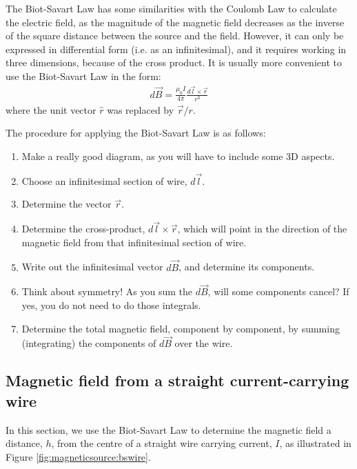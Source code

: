 The Biot-Savart Law has some similarities with the Coulomb Law to calculate the electric field, as the magnitude of the magnetic field decreases as the inverse of the square distance between the source and the field. However, it can only be expressed in differential form (i.e. as an infinitesimal), and it requires working in three dimensions, because of the cross product. It is usually more convenient to use the Biot-Savart Law in the form:
\begin{align*}
d\vec B = \frac{\mu_0 I}{4\pi}\frac{d\vec l\times \vec r}{r^3}
\end{align*}
where the unit vector $\hat r$ was replaced by $\vec r/r$.

The procedure for applying the Biot-Savart Law is as follows:
\begin{enumerate}
\item Make a really good diagram, as you will have to include some 3D aspects.
\item Choose an infinitesimal section of wire, $d\vec l$.
\item Determine the vector $\vec r$.
\item Determine the cross-product, $d\vec l \times \vec r$, which will point in the direction of the magnetic field from that infinitesimal section of wire.
\item Write out the infinitesimal vector $d\vec B$, and determine its components.
\item Think about symmetry! As you sum the $d\vec B$, will some components cancel? If yes, you do not need to do those integrals.
\item Determine the total magnetic field, component by component, by summing (integrating) the components of $d\vec B$ over the wire.
\end{enumerate}

\subsection{Magnetic field from a straight current-carrying wire}
In this section, we use the Biot-Savart Law to determine the magnetic field a distance, $h$, from the centre of a straight wire carrying current, $I$, as illustrated in Figure \ref{fig:magneticsource:bswire}.

